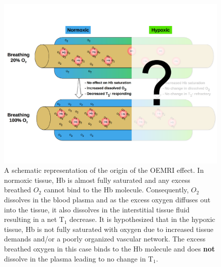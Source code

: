 	\begin{figure}
		\begin{center}
		\includegraphics[width=\textwidth]{./intro/intro-images/oemriDark.pdf}
		\caption{A schematic representation of the origin of the OEMRI effect. In normoxic tissue, Hb is almost fully saturated and any excess breathed ${O_2}$ cannot bind to the Hb molecule. Consequently, ${O_2}$ dissolves in the blood plasma and as the excess oxygen diffuses out into the tissue, it also dissolves in the interstitial tissue fluid resulting in a net T$_1$ decrease. It is hypothesized that in the hypoxic tissue, Hb is not fully saturated with oxygen due to increased tissue demands and/or a poorly organized vascular network. The excess breathed oxygen in this case binds to the Hb molecule and does \textbf{not} dissolve in the plasma leading to no change in T$_1$.}
		\label{oemri}
		\end{center}
	\end{figure}

